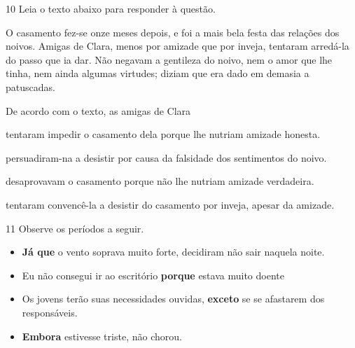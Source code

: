 \num{10} Leia o texto abaixo para responder à questão. 

\begin{myquote}

O casamento fez-se onze meses depois, e foi a mais bela festa das
relações dos noivos. Amigas de Clara, menos por amizade que por
inveja, tentaram arredá-la do passo que ia dar. Não negavam a gentileza
do noivo, nem o amor que lhe tinha, nem ainda algumas virtudes; diziam
que era dado em demasia a patuscadas.


\end{myquote}

De acordo com o texto, as amigas de Clara

\begin{escolha}

    \item tentaram impedir o casamento dela porque lhe nutriam amizade honesta.

    \item persuadiram-na a desistir por causa da falsidade dos sentimentos do noivo.  

    \item desaprovavam o casamento porque não lhe nutriam amizade verdadeira.

    \item tentaram convencê-la a desistir do casamento por inveja, apesar da amizade.

\end{escolha}

\num{11} Observe os períodos a seguir.

\begin{itemize}

    \item \textbf{Já que} o vento soprava muito forte, decidiram não sair
naquela noite.

    \item Eu não consegui ir ao escritório \textbf{porque} estava muito doente

    \item Os jovens terão suas necessidades ouvidas, \textbf{exceto} se se
afastarem dos responsáveis.

    \item \textbf{Embora} estivesse triste, não chorou.

\end{itemize}

